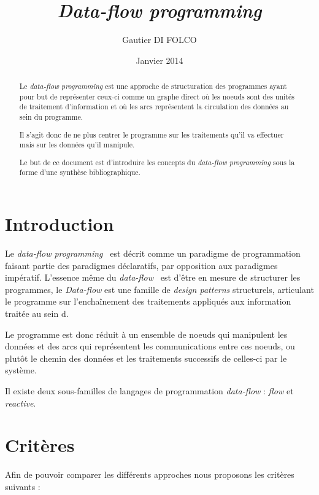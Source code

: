 \documentclass{article}
\title{\emph{Data-flow programming}}
\author{Gautier DI FOLCO}
\date{Janvier 2014}
\begin{document}
\maketitle
\tableofcontents

\begin{abstract}
Le \emph{data-flow programming} est une approche de structuration des programmes
ayant pour but de représenter ceux-ci comme un graphe direct où les noeuds sont
des unités de traitement d'information et où les arcs représentent la circulation
des données au sein du programme.

Il s'agit donc de ne plus centrer le programme sur les traitements qu'il va
effectuer mais sur les données qu'il manipule.

Le but de ce document est d'introduire les concepts du \emph{data-flow programming}
sous la forme d'une synthèse bibliographique.
\end{abstract}

\section{Introduction}\label{introduction}

Le \emph{data-flow programming}~\cite{dataflow} est décrit comme un paradigme de
programmation faisant partie des paradigmes déclaratifs, par opposition
aux paradigmes impératif.
L'essence même du \emph{data-flow}~\cite{dataflow} est d'être en mesure de structurer
les programmes, le \emph{Data-flow} est une famille de
\emph{design patterns} structurels, articulant le programme sur l'enchaînement des
traitements appliqués aux information traitée au sein d.

Le programme est donc réduit à un ensemble de noeuds qui
manipulent les données et des arcs qui représentent les
communications entre ces noeuds, ou plutôt le chemin des
données et les traitements successifs de celles-ci par le système.

Il existe deux sous-familles de langages de programmation \emph{data-flow} :
\emph{flow} et \emph{reactive}. 

\section{Critères}\label{criteres}
Afin de pouvoir comparer les différents approches nous proposons les critères suivants :
\end{document}
